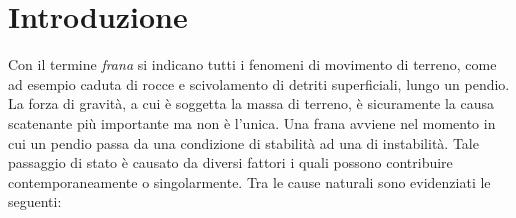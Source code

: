 
\chapter{Introduzione} %

\label{ch:introduction} %

Con il termine \textit{frana} si indicano tutti i fenomeni di movimento di terreno, come ad esempio caduta di rocce e  scivolamento di detriti superficiali, lungo un pendio.
La forza di gravità, a cui è soggetta la massa di terreno, è sicuramente la causa scatenante più importante ma non è l'unica. Una frana avviene nel momento in cui un pendio passa da una condizione di stabilità ad una di instabilità.
Tale passaggio di stato è causato da diversi fattori i quali possono contribuire contemporaneamente o singolarmente.
Tra le cause naturali sono evidenziati le seguenti:


